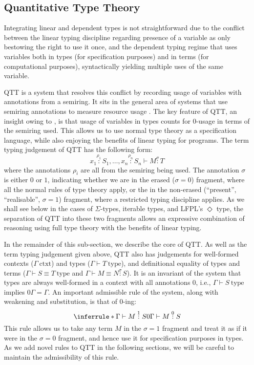 \documentclass[acmsmall,screen]{acmart}
\newcommand{\istype}{\mathrm{type}}
\newcommand{\isctxt}{\mathrm{ctxt}}
\begin{document}
\subsection{Quantitative Type Theory}
\label{sec:qtt-basic}

Integrating linear and dependent types is not straightforward due to
the conflict between the linear typing discipline regarding presence
of a variable as only bestowing the right to use it once, and the
dependent typing regime that uses variables both in types (for
specification purposes) and in terms (for computational purposes),
syntactically yielding multiple uses of the same variable.

QTT is a system that resolves this conflict by recording usage of
variables with annotations from a semiring. It sits in the general
area of systems that use semiring annotations to measure resource usage
\cite{BrunelGMZ14,GhicaS14,OrchardLE19}. The key feature of QTT, an
insight owing to \citet{mcbride16}, is that usage of variables in
types counts for $0$-usage in terms of the semiring used. This allows
us to use normal type theory as a specification language, while also
enjoying the benefits of linear typing for programs. The term typing
judgement of QTT has the following form:
\begin{displaymath}
  x_1 \stackrel{\rho_1}: S_1, \dots, x_n \stackrel{\rho_n}: S_n \vdash M \stackrel\sigma: T
\end{displaymath}
where the annotations $\rho_i$ are all from the semiring being
used. The annotation $\sigma$ is either $0$ or $1$, indicating whether
we are in the erased ($\sigma = 0$) fragment, where all the normal
rules of type theory apply, or the in the non-erased (``present'',
``realisable'', $\sigma = 1$) fragment, where a restricted typing
discipline applies.  As we shall see below in the cases of
$\Sigma$-types, iterable types, and LFPL's $\Diamond$ type, the
separation of QTT into these two fragments allows an expressive
combination of reasoning using full type theory with the benefits of
linear typing.

In the remainder of this sub-section, we describe the core of QTT. As
well as the term typing judgement given above, QTT also has judgements
for well-formed contexts ($\Gamma~\isctxt$) and types
($\Gamma \vdash T~\istype$), and definitional equality of types and
terms ($\Gamma \vdash S \equiv T~\istype$ and
$\Gamma \vdash M \equiv N \stackrel\sigma: S$). It is an invariant of
the system that types are always well-formed in a context with all
annotations $0$, i.e., $\Gamma \vdash S~\istype$ implies
$0\Gamma = \Gamma$. An important admissible rule of the system, along
with weakening and substitution, is that of $0$-ing:
\begin{displaymath}
  \inferrule*
  {\Gamma \vdash M \stackrel1: S}
  {0\Gamma \vdash M \stackrel0: S}
\end{displaymath}
This rule allows us to take any term $M$ in the $\sigma = 1$ fragment
and treat it as if it were in the $\sigma = 0$ fragment, and hence use
it for specification purposes in types. As we add novel rules to QTT
in the following sections, we will be careful to maintain the
admissibility of this rule.
\end{document}
